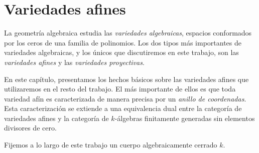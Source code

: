 \chapter{Variedades afines}

\noindent La geometría algebraica estudia las \textit{variedades algebraicas}, espacios conformados por los ceros de una familia de polinomios. Los dos tipos más importantes de variedades algebraicas, y los únicos que discutiremos en este trabajo, son las \textit{variedades afines} y las \textit{variedades proyectivas}.

En este capítulo, presentamos los hechos básicos sobre las variedades afines que utilizaremos en el resto del trabajo. El más importante de ellos es que toda variedad afín es caracterizada de manera precisa por un \textit{anillo de coordenadas}. Esta caracterización se extiende a una equivalencia dual entre la categoría de variedades afines y la categoría de $k$-álgebras finitamente generadas sin elementos divisores de cero.

Fijemos a lo largo de este trabajo un cuerpo algebraicamente cerrado $k$.
